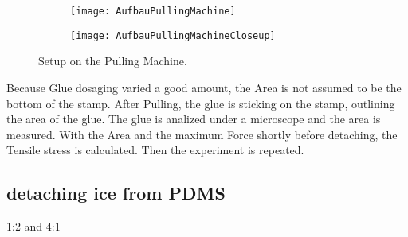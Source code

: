 \begin{figure}[hbt!]
	\centering
	\begin{subfigure}[]{0.45\textwidth}
		\centering
		\texttt{[image: AufbauPullingMachine]}
		\caption{}
	\end{subfigure}
	\begin{subfigure}[]{0.45\textwidth}
		\centering
		\texttt{[image: AufbauPullingMachineCloseup]}
		\caption{}
	\end{subfigure}
	\caption{Setup on the Pulling Machine.}
	\label{fig:PullingMachineSetup}
\end{figure}

Because Glue dosaging varied a good amount, the Area is not assumed to be the bottom of the stamp. After Pulling, the glue is sticking on the stamp, outlining the area of the glue. The glue is analized under a microscope and the area is measured. With the Area and the maximum Force shortly before detaching, the Tensile stress is calculated. Then the experiment is repeated.



\subsection{detaching ice from PDMS}

1:2 and 4:1

